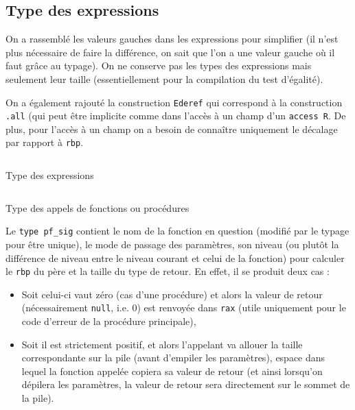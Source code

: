 \documentclass[a4paper, 10pt, french]{article}
\newcommand{\codeAda}[1]{\texttt{#1}}
\newcommand{\codeOCaml}[1]{\texttt{#1}}
\newcommand{\codeASM}[1]{\texttt{#1}}
\begin{document}
\subsection{Type des expressions}

On a rassemblé les valeurs gauches dans les expressions pour simplifier (il n'est plus nécessaire de faire la différence, on sait que l'on a une valeur gauche où il faut grâce au typage). On ne conserve pas les types des expressions mais seulement leur taille (essentiellement pour la compilation du test d'égalité).

On a également rajouté la construction \codeOCaml{Ederef} qui correspond à la construction \codeAda{.all} (qui peut être implicite comme dans l'accès à un champ d'un \codeAda{access R}. De plus, pour l'accès à un champ on a besoin de connaître uniquement le décalage par rapport à \codeASM{rbp}.

\begin{table}[H]
 \inputminted[frame=lines,linenos,style=colorful,fontfamily=tt,breaklines,autogobble,firstline=66,firstnumber=66,lastline=75,label={ast\_typed.ml[66--75]}]{OCaml}{../ast_typed.ml}
  \caption{Type des expressions}
\end{table}

\begin{table}[H]
 \inputminted[frame=lines,linenos,style=colorful,fontfamily=tt,breaklines,autogobble,firstline=58,firstnumber=58,lastline=64,label={ast\_typed.ml[58--64]}]{OCaml}{../ast_typed.ml}
  \caption{Type des appels de fonctions ou procédures}
\end{table}

Le \codeOCaml{type pf_sig} contient le nom de la fonction en question (modifié par le typage pour être unique), le mode de passage des paramètres, son niveau (ou plutôt la différence de niveau entre le niveau courant et celui de la fonction) pour calculer le \codeASM{rbp} du père et la taille du type de retour. En effet, il se produit deux cas :
\begin{itemize}
 \item Soit celui-ci vaut zéro (cas d'une procédure) et alors la valeur de retour (nécessairement \codeAda{null}, i.e. 0) est renvoyée dans \codeASM{rax} (utile uniquement pour le code d'erreur de la procédure principale),
 \item Soit il est strictement positif, et alors l'appelant va allouer la taille correspondante sur la pile (avant d'empiler les paramètres), espace dans lequel la fonction appelée copiera sa valeur de retour (et ainsi lorsqu'on dépilera les paramètres, la valeur de retour sera directement sur le sommet de la pile).
\end{itemize}
\end{document}
